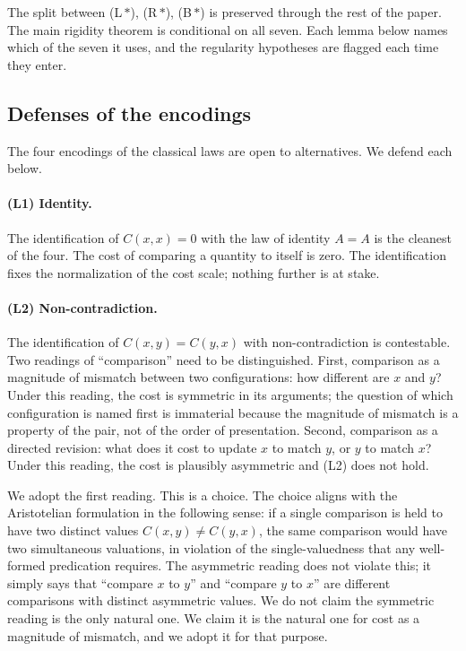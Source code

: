 \documentclass[11pt,a4paper]{article}
\theoremstyle{definition}
\theoremstyle{remark}
\begin{document}
The split between (L\,$*$), (R\,$*$), (B\,$*$) is preserved through
the rest of the paper. The main rigidity theorem is conditional on all
seven. Each lemma below names which of the seven it uses, and the
regularity hypotheses are flagged each time they enter.

\subsection{Defenses of the encodings}\label{subsec:encoding-defenses}

The four encodings of the classical laws are open to alternatives. We
defend each below.

\paragraph{(L1) Identity.} The identification of $C(x, x) = 0$ with the
law of identity $A = A$ is the cleanest of the four. The cost of
comparing a quantity to itself is zero. The identification fixes the
normalization of the cost scale; nothing further is at stake.

\paragraph{(L2) Non-contradiction.} The identification of $C(x, y) =
C(y, x)$ with non-contradiction is contestable. Two readings of
``comparison'' need to be distinguished. First, comparison as a
magnitude of mismatch between two configurations: how different are
$x$ and $y$? Under this reading, the cost is symmetric in its arguments;
the question of which configuration is named first is immaterial because
the magnitude of mismatch is a property of the pair, not of the order
of presentation. Second, comparison as a directed revision: what does it
cost to update $x$ to match $y$, or $y$ to match $x$? Under this reading,
the cost is plausibly asymmetric and (L2) does not hold.

We adopt the first reading. This is a choice. The choice aligns with the
Aristotelian formulation in the following sense: if a single comparison
is held to have two distinct values $C(x, y) \neq C(y, x)$, the same
comparison would have two simultaneous valuations, in violation of the
single-valuedness that any well-formed predication requires. The
asymmetric reading does not violate this; it simply says that ``compare
$x$ to $y$'' and ``compare $y$ to $x$'' are different comparisons with
distinct asymmetric values. We do not claim the symmetric reading is the
only natural one. We claim it is the natural one for cost as a magnitude
of mismatch, and we adopt it for that purpose.
\end{document}
